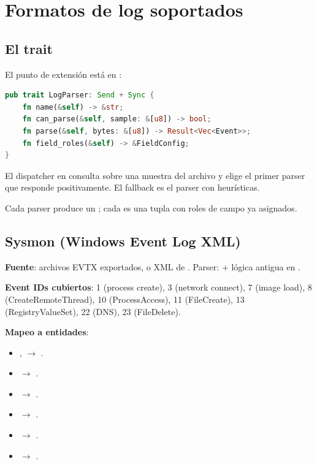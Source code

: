 \chapter{Formatos de log soportados}
\label{sec:log-formats}

\section{El trait }

El punto de extensión está en
:

\begin{lstlisting}[language=Rust]
pub trait LogParser: Send + Sync {
    fn name(&self) -> &str;
    fn can_parse(&self, sample: &[u8]) -> bool;
    fn parse(&self, bytes: &[u8]) -> Result<Vec<Event>>;
    fn field_roles(&self) -> &FieldConfig;
}
\end{lstlisting}

El dispatcher  en
 consulta
 sobre una muestra del archivo y elige el primer
parser que responde positivamente. El fallback es el parser
 con heurísticas.

Cada parser produce un ; cada  es una
tupla  con roles
de campo ya asignados.

\section{Sysmon (Windows Event Log XML)}

\textbf{Fuente}: archivos EVTX exportados, o XML de
. Parser:
 + lógica antigua en
.

\textbf{Event IDs cubiertos}: 1 (process create), 3 (network
connect), 7 (image load), 8 (CreateRemoteThread), 10
(ProcessAccess), 11 (FileCreate), 13 (RegistryValueSet), 22 (DNS),
23 (FileDelete).

\textbf{Mapeo a entidades}:
\begin{itemize}
    \item {},  $\to$ .
    \item {} $\to$ .
    \item {} $\to$ .
    \item {} $\to$ .
    \item {} $\to$ .
    \item {} $\to$ .
\end{itemize}


